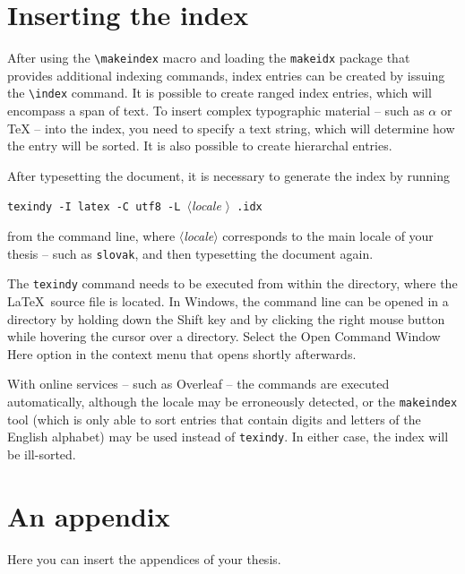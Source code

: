 \documentclass[
  digital, %
  table,   %
  lof,     %
  lot,     %
]{fithesis3}
\begin{document}
  \printbibliography[heading=bibintoc] %

\chapter{Inserting the index}
After using the \verb"\makeindex" macro and loading the
\texttt{makeidx} package that provides additional indexing
commands, index entries can be created by issuing the \verb"\index"
command. It is possible to create ranged index
entries, which will encompass a span of text.
To insert complex typographic material -- such as $\alpha$
 or \TeX{}  --
into the index, you need to specify a text string, which will
determine how the entry will be sorted. It is also possible to
create hierarchal entries. 

After typesetting the document, it is necessary to generate the
index by running
\begin{center}%
  \texttt{texindy -I latex -C utf8 -L }$\langle$\textit{locale}%
  $\rangle$\texttt{ \jobname.idx}
\end{center}
from the command line, where $\langle$\textit{locale}$\rangle$
corresponds to the main locale of your thesis -- such as
\texttt{slovak}, and then typesetting the document again.

The \texttt{texindy} command needs to be executed from within the
directory, where the \LaTeX\ source file is located. In Windows,
the command line can be opened in a directory by holding down the
\textsf{Shift} key and by clicking the right mouse button while
hovering the cursor over a directory. Select the \textsf{Open Command
Window Here} option in the context menu that opens shortly
afterwards.

With online services -- such as Overleaf -- the commands are
executed automatically, although the locale may be erroneously
detected, or the \texttt{makeindex} tool (which is only able to
sort entries that contain digits and letters of the English
alphabet) may be used instead of \texttt{texindy}. In either case,
the index will be ill-sorted.

  \makeatletter\thesis@blocks@clear\makeatother
  \printindex

\appendix %
\chapter{An appendix}
Here you can insert the appendices of your thesis.
\end{document}
